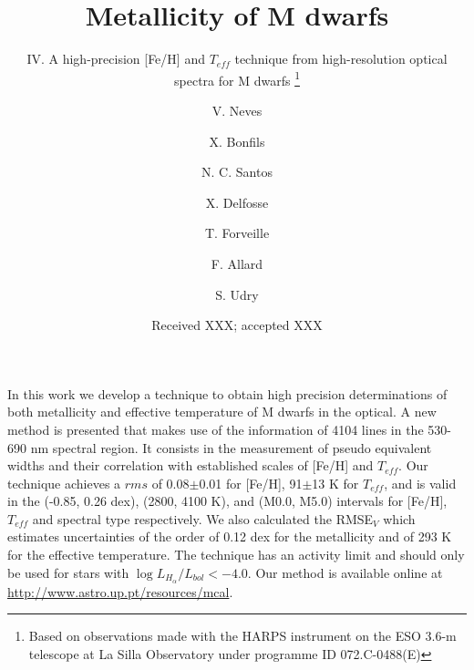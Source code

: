 \documentclass{aa}
\begin{document}
 


   \title{Metallicity of M dwarfs }

  \subtitle{IV. A high-precision [Fe/H] and $T_{eff}$ technique from high-resolution optical spectra for M dwarfs \thanks{Based on observations made with the HARPS instrument on the ESO 3.6-m telescope at La Silla Observatory under programme ID 072.C-0488(E)}}

\author{ V. Neves \and X. Bonfils \and
  N. C. Santos \and X. Delfosse \and
  T. Forveille  \and F. Allard  \and
  S. Udry}

   \date{Received XXX; accepted XXX}

 
  \abstract
{}
   {In this work we develop a technique to obtain high precision determinations of both metallicity and effective temperature of M dwarfs in the optical.}
   {A new method is presented that makes use of the information of 4104 lines in the 530-690 nm spectral region. It consists in the measurement of pseudo equivalent widths and their correlation with established scales of [Fe/H] and $T_{eff}$.}
   {Our technique achieves a $rms$ of 0.08$\pm$0.01 for [Fe/H], 91$\pm$13 K for $T_{eff}$, and is valid in the (-0.85, 0.26 dex), (2800, 4100 K), and (M0.0, M5.0) intervals for [Fe/H], $T_{eff}$ and spectral type respectively. We also calculated the RMSE$_{V}$ which estimates uncertainties of the order of 0.12 dex for the metallicity and of 293 K for the effective temperature. The technique has an activity limit and should only be used for stars with  $\log{L_{H_{\alpha}}/L_{bol}} < -4.0$. Our method is available online at \url{http://www.astro.up.pt/resources/mcal}.  }
   {}
\end{document}
